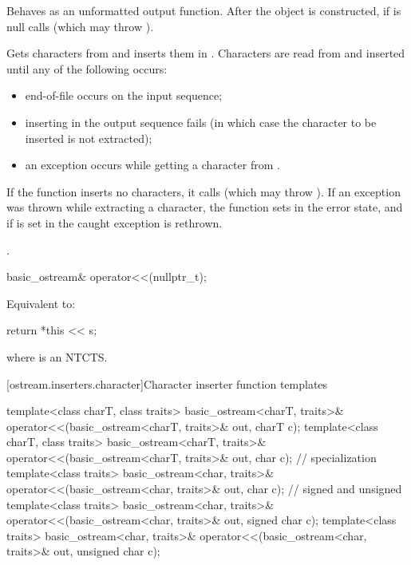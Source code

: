 \begin{itemdescr}
\pnum
\effects
Behaves as an unformatted output function.
After the  object is
constructed, if
 is null calls
(which may throw
).

\pnum
Gets characters from 
and inserts them in
.
Characters are read from 
and inserted until any of the following occurs:
\begin{itemize}
\item
end-of-file occurs on the input sequence;
\item
inserting in the output sequence fails
(in which case the character to be inserted is not extracted);
\item
an exception occurs while getting a character from .
\end{itemize}

\pnum
If the function inserts no characters, it calls
(which may throw
).
If an exception was thrown while extracting a character,
the function sets
in the error state, and if
is set in
the caught exception is rethrown.

\pnum
\returns
{}.
\end{itemdescr}

%
\begin{itemdecl}
basic_ostream& operator<<(nullptr_t);
\end{itemdecl}

\begin{itemdescr}
\pnum
\effects
Equivalent to:
\begin{codeblock}
return *this << s;
\end{codeblock}
where  is an
NTCTS.
\end{itemdescr}

[ostream.inserters.character]{Character inserter function templates}

%
\begin{itemdecl}
template<class charT, class traits>
  basic_ostream<charT, traits>& operator<<(basic_ostream<charT, traits>& out, charT c);
template<class charT, class traits>
  basic_ostream<charT, traits>& operator<<(basic_ostream<charT, traits>& out, char c);
// specialization
template<class traits>
  basic_ostream<char, traits>& operator<<(basic_ostream<char, traits>& out, char c);
// signed and unsigned
template<class traits>
  basic_ostream<char, traits>& operator<<(basic_ostream<char, traits>& out, signed char c);
template<class traits>
  basic_ostream<char, traits>& operator<<(basic_ostream<char, traits>& out, unsigned char c);
\end{itemdecl}

